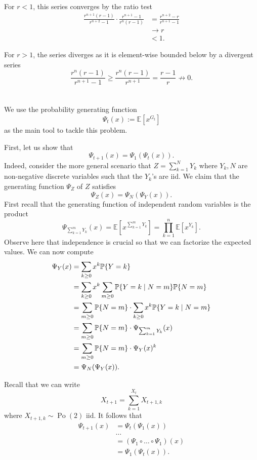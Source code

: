 \documentclass[10pt]{article}
\DeclarePairedDelimiter{\set}{\lbrace}{\rbrace}
\DeclareMathOperator{\Po}{Po}
\newcommand{\E}{\mathbb{E}}
\renewcommand{\P}{\mathbb{P}}
\begin{document}
For $r < 1$,
this series converges by the ratio test
\begin{align*}
  \frac{r^{n+1}(r-1)}{r^{n+2}-1}\cdot \frac{r^{n+1}-1}{r^n (r-1)}
  &= \frac{r^{n+2} - r}{r^{n+1}-1} \\
  &\to r \\
  &< 1.
\end{align*}

For $r > 1$,
the series diverges as it is element-wise bounded below by a divergent series
\[
  \frac{r^n (r-1)}{r^{n+1} - 1}
  \geq \frac{r^n (r-1)}{r^{n+1}}
  = \frac{r-1}{r}
  \not\to 0.
\]

\clearpage
\section{}
We use the probability generating function
\[
  \Psi_t(x)
  := \E\left[ x^{G_t} \right]
\]
as the main tool to tackle this problem.

First,
let us show that
\[
  \Psi_{t+1}(x) = \Psi_1(\Psi_t(x)).
\]
Indeed,
consider the more general scenario that $Z = \sum_{k=1}^N Y_k$
where $Y_k, N$ are non-negative discrete variables
such that the $Y_k$'s are iid.
We claim that the generating function $\Psi_Z$ of $Z$ satisfies
\[
  \Psi_Z(x) = \Psi_N(\Psi_Y(x)).
\]
First recall that the generating function of independent random variables is the product
\[
  \Psi_{\sum_{k=1}^m Y_k}(x)
  = \E\left[ x^{\sum_{k=1}^m Y_k} \right]
  = \prod_{k=1}^n \E\left[ x^{Y_k} \right].
\]
Observe here that independence is crucial so that we can factorize the expected values.
We can now compute
\begin{align*}
  \Psi_Y(x)
  &= \sum_{k\geq 0} x^k \P\set{Y = k} \\
  &= \sum_{k\geq 0} x^k \sum_{m\geq 0} \P\set{Y = k\mid N=m}\P\set{N=m} \\
  &= \sum_{m\geq 0} \P\set{N=m}\cdot \sum_{k\geq 0} x^k \P\set{Y = k\mid N=m} \\
  &= \sum_{m\geq 0} \P\set{N=m}\cdot \Psi_{\sum_{k=1}^m Y_k}(x) \\
  &= \sum_{m\geq 0} \P\set{N=m}\cdot \Psi_Y(x)^k \\
  &= \Psi_N(\Psi_Y(x)).
\end{align*}

Recall that we can write
\[
  X_{t+1} = \sum_{k=1}^{X_t} X_{t+1, k}
\]
where $X_{t+1, k}\sim \Po(2)$ iid.
It follows that
\begin{align*}
  \Psi_{t+1}(x)
  &= \Psi_t(\Psi_1(x)) \\
  &\dots \\
  &= (\Psi_1\circ \dots\circ \Psi_1) (x) \\
  &= \Psi_1(\Psi_t(x)).
\end{align*}
\end{document}
